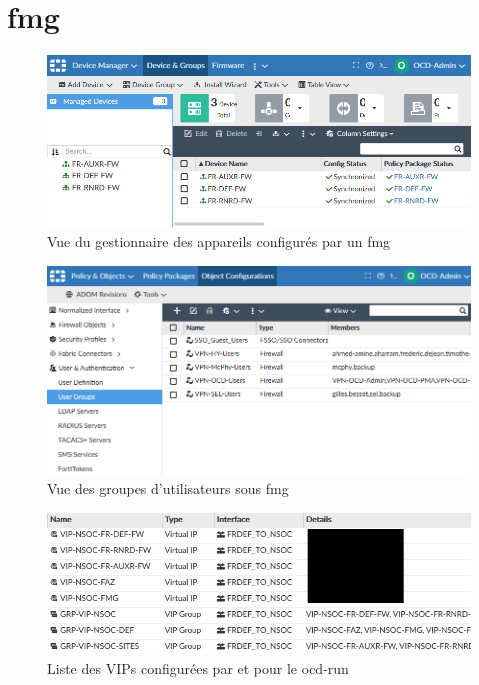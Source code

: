 \documentclass[12pt, oneside, a4paper, titlepage]{report}
\begin{document}
\section{\acrlong{fmg}}%
\label{sec:annexes::fmg}

\begin{figure}[h!]
    \centering
    \includegraphics[width = \linewidth]{img/fmg/device-manager.png}
    \caption{Vue du gestionnaire des appareils configurés par un \acrlong{fmg}}%
    \label{fig:fmg/device-manager.png}
\end{figure}

\begin{figure}[h!]
    \centering
    \includegraphics[width = \linewidth]{img/fmg/user-groups.png}
    \caption{Vue des groupes d'utilisateurs sous \acrlong{fmg}}%
    \label{fig:fmg/user-groups}
\end{figure}

\begin{figure}[h!]
    \centering
    \includegraphics[width = \linewidth]{img/fmg/vips.png}
    \caption{Liste des VIPs configurées par et pour le \gls{ocd-run}}%
    \label{fig:fmg/vips.png}
\end{figure}
\end{document}
